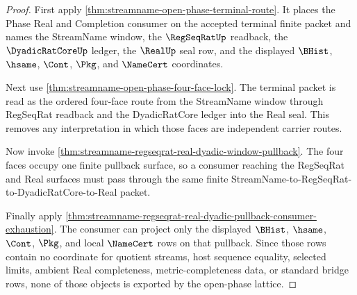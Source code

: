 \begin{proof}
First apply \autoref{thm:streamname-open-phase-terminal-route}. It places the Phase Real and Completion consumer on the accepted terminal finite packet and names the StreamName window, the $\RegSeqRatUp$ readback, the $\DyadicRatCoreUp$ ledger, the $\RealUp$ seal row, and the displayed $\BHist$, $\hsame$, $\Cont$, $\Pkg$, and $\NameCert$ coordinates.

Next use \autoref{thm:streamname-open-phase-four-face-lock}. The terminal packet is read as the ordered four-face route from the StreamName window through RegSeqRat readback and the DyadicRatCore ledger into the Real seal. This removes any interpretation in which those faces are independent carrier routes.

Now invoke \autoref{thm:streamname-regseqrat-real-dyadic-window-pullback}. The four faces occupy one finite pullback surface, so a consumer reaching the RegSeqRat and Real surfaces must pass through the same finite StreamName-to-RegSeqRat-to-DyadicRatCore-to-Real packet.

Finally apply \autoref{thm:streamname-regseqrat-real-dyadic-pullback-consumer-exhaustion}. The consumer can project only the displayed $\BHist$, $\hsame$, $\Cont$, $\Pkg$, and local $\NameCert$ rows on that pullback. Since those rows contain no coordinate for quotient streams, host sequence equality, selected limits, ambient Real completeness, metric-completeness data, or standard bridge rows, none of those objects is exported by the open-phase lattice.
\end{proof}

